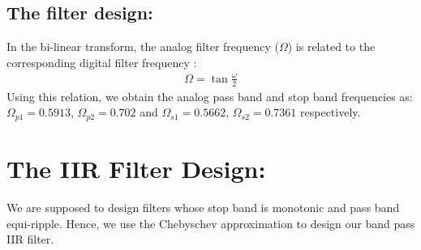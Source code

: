 \documentclass{article}
\begin{document}
\subsection{\textbf{The filter design:}}
In the bi-linear transform, the analog filter frequency ($\Omega$) is related to the corresponding digital filter frequency\brak{\omega} :
\begin{align}
  \Omega = \tan \frac{\omega}{2}  
\end{align}
Using this relation, we obtain the analog pass band and stop band frequencies as:
$\Omega_{p1} = 0.5913$, $\Omega_{p2} = 0.702$ and $\Omega_{s1} = 0.5662$, $\Omega_{s2} = 0.7361$
respectively.
\section{ The IIR Filter Design:}
We are supposed to design filters whose stop band is monotonic and pass band equi-ripple. Hence, we use the Chebyschev approximation to design our band pass IIR filter.
\end{document}
